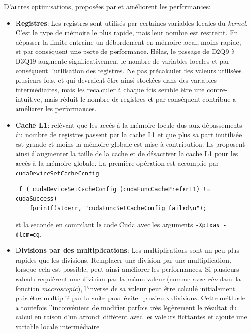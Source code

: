 D'autres optimisations, proposées par \citet{januszewski_sailfish_2014} et \citet{tran_performance_2017} améliorent les performances:
\begin{itemize}
\item \textbf{Registres}: Les registres sont utilisés par certaines variables locales du \textit{kernel}. C'est le type de mémoire le plus rapide, mais leur nombre est restreint. En dépasser la limite entraîne un débordement en mémoire local, moins rapide, et par conséquent une perte de performance. Hélas, le passage de D2Q9 à D3Q19 augmente significativement le nombre de variables locales et par conséquent l'utilisation des registres. Ne pas précalculer des valeurs utilisées plusieurs fois, et qui devraient être ainsi stockées dans des variables intermédiaires, mais les recalculer à chaque fois semble être une  contre-intuitive, mais réduit le nombre de registres et par conséquent contribue à améliorer les performances.
\item \textbf{Cache L1}: \citet{januszewski_sailfish_2014} relèvent que les accès à la mémoire locale dus aux dépassements du nombre de registres passent par la cache L1 et que plus sa part inutilisée est grande et moins la mémoire globale est mise à contribution. Ils proposent ainsi d'augmenter la taille de la cache et de désactiver la cache L1 pour les accès à la mémoire globale. La première opération est accomplie par \texttt{cudaDeviceSetCacheConfig}:
\begin{lstlisting}[numbers=none]
if ( cudaDeviceSetCacheConfig (cudaFuncCachePreferL1) != cudaSuccess)
	fprintf(stderr, "cudaFuncSetCacheConfig failed\n");
\end{lstlisting}
et la seconde en compilant le code Cuda avec les arguments \texttt{-Xptxas -dlcm=cg}.
\item \textbf{Divisions par des multiplications}: Les multiplications sont un peu plus rapides que les divisions. Remplacer une division par une multiplication, lorsque cela est possible, peut ainsi améliorer les performances. Si plusieurs calculs requièrent une division par la même valeur (comme avec \textit{rho} dans la fonction \textit{macroscopic}), l'inverse de sa valeur peut être calculé initialement puis être multiplié par la suite pour éviter plusieurs divisions. Cette méthode a toutefois l'inconvénient de modifier parfois très légèrement le résultat du calcul en raison d'un arrondi différent avec les valeurs flottantes et ajoute une variable locale intermédiaire.
\end{itemize}


